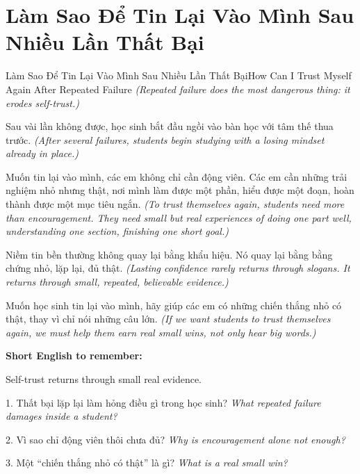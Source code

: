 \section{Làm Sao Để Tin Lại Vào Mình Sau Nhiều Lần Thất Bại}
\begin{truyen}{Làm Sao Để Tin Lại Vào Mình Sau Nhiều Lần Thất Bại}{How Can I Trust Myself Again After Repeated Failure}
\textit{(Repeated failure does the most dangerous thing: it erodes self-trust.)}

Sau vài lần không được, học sinh bắt đầu ngồi vào bàn học với tâm thế thua trước.
\textit{(After several failures, students begin studying with a losing mindset already in place.)}

Muốn tin lại vào mình, các em không chỉ cần động viên. Các em cần những trải nghiệm nhỏ nhưng thật, nơi mình làm được một phần, hiểu được một đoạn, hoàn thành được một mục tiêu ngắn.
\textit{(To trust themselves again, students need more than encouragement. They need small but real experiences of doing one part well, understanding one section, finishing one short goal.)}

Niềm tin bền thường không quay lại bằng khẩu hiệu. Nó quay lại bằng bằng chứng nhỏ, lặp lại, đủ thật.
\textit{(Lasting confidence rarely returns through slogans. It returns through small, repeated, believable evidence.)}
\end{truyen}

\begin{baihoc}
Muốn học sinh tin lại vào mình, hãy giúp các em có những chiến thắng nhỏ có thật, thay vì chỉ nói những câu lớn.
\textit{(If we want students to trust themselves again, we must help them earn real small wins, not only hear big words.)}
\end{baihoc}

\begin{ghinhoanh}
\textbf{Short English to remember:}

Self-trust returns through small real evidence.

\end{ghinhoanh}

\begin{tuhocnhanh}
1. Thất bại lặp lại làm hỏng điều gì trong học sinh? \textit{What repeated failure damages inside a student?}

2. Vì sao chỉ động viên thôi chưa đủ? \textit{Why is encouragement alone not enough?}

3. Một “chiến thắng nhỏ có thật” là gì? \textit{What is a real small win?}
\end{tuhocnhanh}
\ngancach

